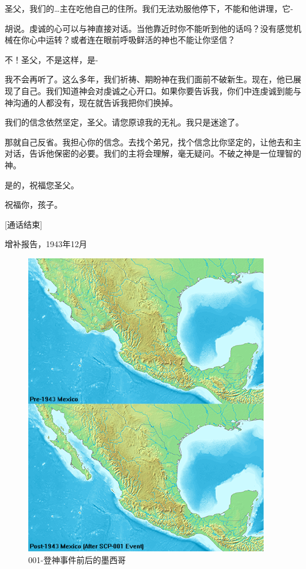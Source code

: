 \begin{scpbox}
圣父，我们的…主在吃他自己的住所。我们无法劝服他停下，不能和他讲理，它-

胡说。虔诚的心可以与神直接对话。当他靠近时你不能听到他的话吗？没有感觉机械在你心中运转？或者连在眼前呼吸鲜活的神也不能让你坚信？

不！圣父，不是这样，是-

我不会再听了。这么多年，我们祈祷、期盼神在我们面前不破新生。现在，他已展现了自己。我们知道神会对虔诚之心开口。如果你要告诉我，你们中连虔诚到能与神沟通的人都没有，现在就告诉我把你们换掉。

我们的信念依然坚定，圣父。请您原谅我的无礼。我只是迷途了。

那就自己反省。我担心你的信念。去找个弟兄，找个信念比你坚定的，让他去和主对话，告诉他保密的必要。我们的主将会理解，毫无疑问。不破之神是一位理智的神。

是的，祝福您圣父。

祝福你，孩子。

[通话结束]

\end{scpbox}

增补报告，1943年12月 \\

\begin{figure}[H]
	\centering
	\includegraphics[width=0.5\linewidth]{images/SCP.001.the.broken.god.5.png}
	\caption*{001-登神事件前后的墨西哥}
\end{figure}

